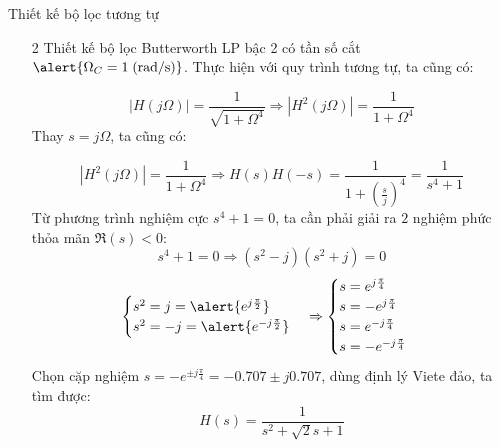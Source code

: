 \documentclass[8pt]{beamer}
\begin{document}
\begin{frame}{Thiết kế bộ lọc tương tự}
	\begin{enumerate}
		\item[2] Thiết kế bộ lọc Butterworth LP bậc 2 có tần số cắt $\alert{\Omega_{C}=1\;\text{(rad/s)}}$.  Thực hiện với quy trình tương tự, ta cũng có:

$$|H(j\Omega)|=\frac{1}{\sqrt{1+\Omega^4}}\Rightarrow |H^2(j\Omega)|=\frac{1}{1+\Omega^4}$$
Thay $s=j\Omega$, ta cũng có:

$$|H^2(j\Omega)|=\frac{1}{1+\Omega^4}\Rightarrow H(s)H(-s)=\frac{1}{1+\left(\frac{s}{j}\right)^4}=\frac{1}{s^4+1}$$
Từ phương trình nghiệm cực $s^4+1=0$, ta cần phải giải ra $2$ nghiệm phức thỏa mãn $\Re{(s)}<0$:
$$s^4+1=0\Rightarrow(s^2-j)(s^2+j)=0$$
\begin{equation*}
\begin{cases}
	s^2=j=\alert{e^{j\frac{\pi}{2}}}\\
	s^2=-j=\alert{e^{-j\frac{\pi}{2}}}\\
\end{cases}
\Rightarrow
\begin{cases}
	s=e^{j\frac{\pi}{4}}\\
	s=-e^{j\frac{\pi}{4}}\\

	s=e^{-j\frac{\pi}{4}}\\
	s=-e^{-j\frac{\pi}{4}}\\
\end{cases}
\end{equation*}
Chọn cặp nghiệm $s=-e^{\pm j\frac{\pi}{4}}=-0.707\pm j0.707$, dùng định lý Viete đảo, ta tìm được: $$H(s)=\frac{1}{s^2+\sqrt{2}s+1}$$
	\end{enumerate}
\end{frame}
\end{document}
